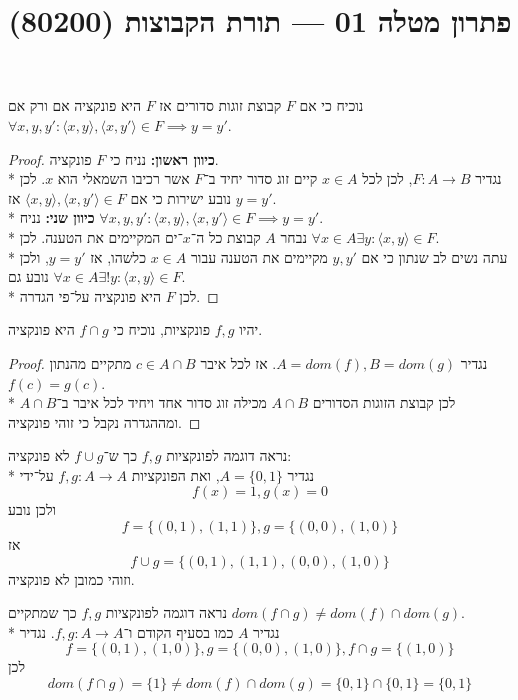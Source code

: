 
\title{פתרון מטלה 01 --- תורת הקבוצות (80200)}


\maketitle
\maketitleprint{}

\Question{}
\Subquestion{}
נוכיח כי אם $F$ קבוצת זוגות סדורים אז $F$ היא פונקציה אם ורק אם $\forall x, y, y': \langle x, y\rangle, \langle x, y' \rangle \in F \implies y = y'$.
\begin{proof}
	\textbf{כיוון ראשון:}
	נניח כי $F$ פונקציה. \\*
	נגדיר $F : A \to B$, לכן לכל $x \in A$ קיים זוג סדור יחיד ב־$F$ אשר רכיבו השמאלי הוא $x$. לכן נובע ישירות כי אם $\langle x, y\rangle, \langle x, y' \rangle \in F$ אז $y = y'$. \\*
	\textbf{כיוון שני:}
	נניח $\forall x, y, y': \langle x, y\rangle, \langle x, y' \rangle \in F \implies y = y'$. \\*
	נבחר $A$ קבוצת כל ה־$x$־ים המקיימים את הטענה.
	לכן $\forall x \in A \exists y : \langle x, y \rangle \in F$. \\*
	עתה נשים לב שנתון כי אם $y, y'$ מקיימים את הטענה עבור $x \in A$ כלשהו, אז $y = y'$, ולכן נובע גם
	$\forall x \in A \exists ! y : \langle x, y \rangle \in F$. \\*
	לכן $F$ היא פונקציה על־פי הגדרה.
\end{proof}

\Subquestion{}
יהיו $f, g$ פונקציות, נוכיח כי $f \cap g$ היא פונקציה.
\begin{proof}
	נגדיר $A = dom(f), B = dom(g)$. אז לכל איבר $c \in A \cap B$ מתקיים מהנתון $f(c) = g(c)$. \\*
	לכן קבוצת הזוגות הסדורים $A \cap B$ מכילה זוג סדור אחד ויחיד לכל איבר ב־$A \cap B$ ומההגדרה נקבל כי זוהי פונקציה.
\end{proof}

\Subquestion{}
נראה דוגמה לפונקציות $f, g$ כך ש־$f \cup g$ לא פונקציה: \\*
נגדיר $A = \{0, 1\}$, ואת הפונקציות $f, g : A \to A$ על־ידי
\[
	f(x) = 1, g(x) = 0
\]
ולכן נובע
\[
	f = \{(0, 1), (1, 1)\}, g = \{(0, 0), (1, 0)\}
\]
אז
\[
	f \cup g = \{(0, 1), (1, 1), (0, 0), (1, 0)\}
\]
וזוהי כמובן לא פונקציה.

\Subquestion{}
נראה דוגמה לפונקציות $f, g$ כך שמתקיים $dom(f \cap g) \ne dom(f) \cap dom(g)$. \\*
נגדיר $A$ כמו בסעיף הקודם ו־$f, g : A \to A$. נגדיר
\[
	f = \{(0, 1), (1, 0)\}, g = \{(0, 0), (1, 0)\}, f \cap g = \{(1, 0)\}
\]
לכן
\[
	dom(f \cap g) = \{1\} \ne dom(f) \cap dom(g) = \{0, 1\} \cap \{0, 1\} = \{0, 1\}
\]

